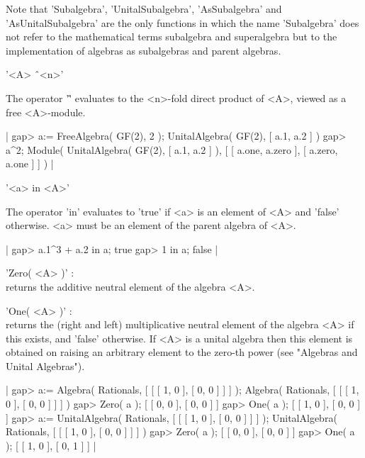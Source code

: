 Note that 'Subalgebra', 'UnitalSubalgebra', 'AsSubalgebra' and
'AsUnitalSubalgebra' are the only functions in which the name
'Subalgebra' does not refer to the mathematical terms subalgebra and 
superalgebra but to the implementation of algebras as subalgebras and
parent algebras.


'<A> \^\ <n>'

The operator '\^' evaluates to the <n>-fold direct product of <A>,
viewed as a free <A>-module.

|    gap> a:= FreeAlgebra( GF(2), 2 );
    UnitalAlgebra( GF(2), [ a.1, a.2 ] )
    gap> a^2;
    Module( UnitalAlgebra( GF(2), [ a.1, a.2 ] ), 
    [ [ a.one, a.zero ], [ a.zero, a.one ] ] ) |

\vspace{5mm}
'<a> in <A>'

The operator 'in' evaluates to 'true' if <a> is an element of <A> and
'false' otherwise. <a> must be an element of the parent algebra of <A>.

|    gap> a.1^3 + a.2 in a;
    true
    gap> 1 in a;
    false |


'Zero( <A> )' : \\
    returns the additive neutral element of the algebra <A>.

'One( <A> )' : \\
    returns the (right and left) multiplicative neutral element of the
    algebra <A> if this exists, and 'false' otherwise.
    If <A> is a unital algebra then this element is obtained on raising
    an arbitrary element to the zero-th power (see "Algebras and Unital
    Algebras").

|    gap> a:= Algebra( Rationals, [ [ [ 1, 0 ], [ 0, 0 ] ] ] );
    Algebra( Rationals, [ [ [ 1, 0 ], [ 0, 0 ] ] ] )
    gap> Zero( a );
    [ [ 0, 0 ], [ 0, 0 ] ]
    gap> One( a );
    [ [ 1, 0 ], [ 0, 0 ] ]
    gap> a:= UnitalAlgebra( Rationals, [ [ [ 1, 0 ], [ 0, 0 ] ] ] );
    UnitalAlgebra( Rationals, [ [ [ 1, 0 ], [ 0, 0 ] ] ] )
    gap> Zero( a );
    [ [ 0, 0 ], [ 0, 0 ] ]
    gap> One( a );
    [ [ 1, 0 ], [ 0, 1 ] ] |


